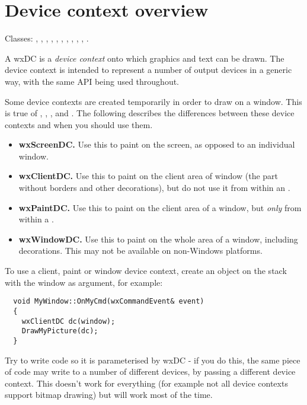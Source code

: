 \section{Device context overview}\label{dcoverview}

Classes: , , , ,\rtfsp
\rtfsp{}, , ,\rtfsp
{}, , ,\rtfsp
{}.

A wxDC is a {\it device context} onto which graphics and text can be drawn.
The device context is intended to represent a number of output devices in a generic way,
with the same API being used throughout.

Some device contexts are created temporarily in order to draw on a window.
This is true of , , ,
and . The following describes the differences between
these device contexts and when you should use them.

\begin{itemize}\itemsep=0pt
\item {\bf wxScreenDC.} Use this to paint on the screen, as opposed to an individual window.
\item {\bf wxClientDC.} Use this to paint on the client area of window (the part without
borders and other decorations), but do not use it from within an .
\item {\bf wxPaintDC.} Use this to paint on the client area of a window, but {\it only} from
within a .
\item {\bf wxWindowDC.} Use this to paint on the whole area of a window, including decorations.
This may not be available on non-Windows platforms.
\end{itemize}

To use a client, paint or window device context, create an object on the stack with
the window as argument, for example:

\begin{verbatim}
  void MyWindow::OnMyCmd(wxCommandEvent& event)
  {
    wxClientDC dc(window);
    DrawMyPicture(dc);
  }
\end{verbatim}

Try to write code so it is parameterised by wxDC - if you do this, the same piece of code may
write to a number of different devices, by passing a different device context. This doesn't
work for everything (for example not all device contexts support bitmap drawing) but
will work most of the time.

